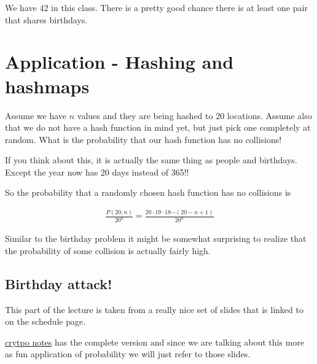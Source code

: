\documentclass[12pt]{article}
\begin{document}
We have 42 in this class. There is a pretty good chance there is at least one pair that shares birthdays.

\section*{Application - Hashing and hashmaps}

Assume we have $n$ values and they are being hashed to 20 locations. Assume also that we do not have a hash function in mind yet, but just pick one completely at random. What is the probability that our hash function has no collisions!

If you think about this, it is actually the same thing as people and birthdays. Except the year now has 20 days instead of 365!!

So the probability that a randomly chosen hash function has no collisions is

\begin{align*}
\frac{P(20, n)}{20^n} = \frac{20 \cdot 19 \cdot 18 \cdots (20 - n + 1)} {20^n}
\end{align*}

Similar to the birthday problem it might be somewhat surprising to realize that the probability of some collision is actually fairly high.

\subsection*{Birthday attack!}

This part of the lecture is taken from a really nice set of slides that is linked to on the schedule page.

\href{http://www.facweb.iitkgp.ernet.in/~sourav/lecture_note9.pdf}{crytpo notes} has the complete version and since we are talking about this more as fun application of probability we will just refer to those slides.
\end{document}
